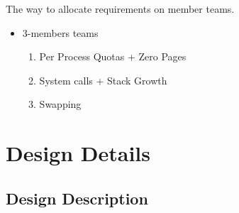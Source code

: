 The way to allocate requirements on member teams. 
\begin{itemize}
    \item 3-members teams
        \begin{enumerate}
            \item Per Process Quotas + Zero Pages
            \item System calls + Stack Growth
            \item Swapping
        \end{enumerate}
\end{itemize}


\section{Design Details}

\subsection{Design Description}

\subsubsection{\taskA}


\subsubsection{\taskB}


\subsubsection{\taskC}

